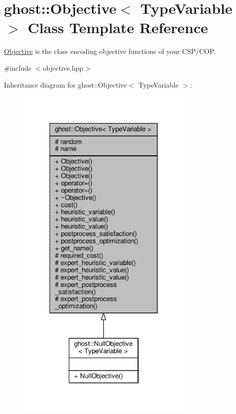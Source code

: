 \hypertarget{classghost_1_1Objective}{\section{ghost\-:\-:Objective$<$ Type\-Variable $>$ Class Template Reference}
\label{classghost_1_1Objective}
}


\hyperlink{classghost_1_1Objective}{Objective} is the class encoding objective functions of your C\-S\-P/\-C\-O\-P.  




{\ttfamily \#include $<$objective.\-hpp$>$}



Inheritance diagram for ghost\-:\-:Objective$<$ Type\-Variable $>$\-:\nopagebreak
\begin{figure}[H]
\begin{center}
\leavevmode
\includegraphics[width=242pt]{classghost_1_1Objective__inherit__graph}
\end{center}
\end{figure}


